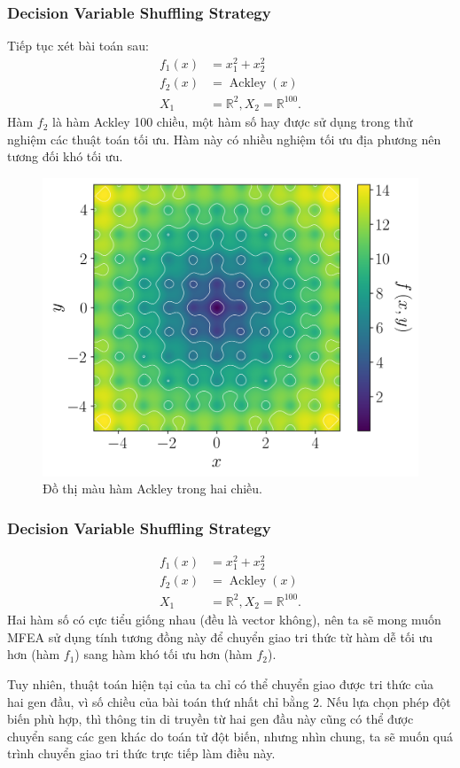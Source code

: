 \begin{frame}[fragile]
\frametitle{Decision Variable Shuffling Strategy}
Tiếp tục xét bài toán sau:
\begin{align*}
  f_{1}(x) &= x_{1}^2+x_{2}^2 \\
  f_{2}(x) &= \operatorname{Ackley}(x) \\
  X_{1} &= \mathbb{R}^2, X_{2} = \mathbb{R}^{100}
.\end{align*}
Hàm \( f_{2} \) là hàm Ackley 100 chiều, một hàm số hay được sử dụng trong thử
nghiệm các thuật toán tối ưu. Hàm này có nhiều nghiệm tối ưu địa phương nên
tương đối khó tối ưu.
\begin{figure}
  \centering
  \includegraphics[height=0.3\textheight]{res/ackley.png}
  \caption{Đồ thị màu hàm Ackley trong hai chiều.}
\end{figure}
\end{frame}

\begin{frame}[fragile]
\frametitle{Decision Variable Shuffling Strategy}
\begin{align*}
  f_{1}(x) &= x_{1}^2+x_{2}^2 \\
  f_{2}(x) &= \operatorname{Ackley}(x) \\
  X_{1} &= \mathbb{R}^2, X_{2} = \mathbb{R}^{100}
.\end{align*}
Hai hàm số có cực tiểu giống nhau (đều là vector không), nên ta sẽ mong muốn
MFEA sử dụng tính tương đồng này để chuyển giao tri thức từ hàm dễ tối ưu hơn
(hàm \( f_{1} \)) sang hàm khó tối ưu hơn (hàm \( f_{2} \)).

Tuy nhiên, thuật toán hiện tại của ta chỉ có thể chuyển giao được tri thức của
hai gen đầu, vì số chiều của bài toán thứ nhất chỉ bằng 2. Nếu lựa chọn phép đột
biến phù hợp, thì thông tin di truyền từ hai gen đầu này cũng có thể được chuyển
sang các gen khác do toán tử đột biến, nhưng nhìn chung, ta sẽ muốn quá trình
chuyển giao tri thức trực tiếp làm điều này.
\end{frame}

